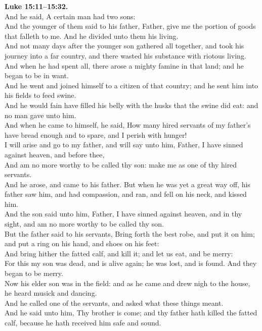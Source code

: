 \documentclass[10pt]{article} %
\begin{document}
{\begin{minipage}[t]{0.45\textwidth}
\textbf{Luke 15:11--15:32.}\\
And he said, A certain man had two sons:\\
And the younger of them said to his father, Father, give me the portion of goods that falleth to me. And he divided unto them his living.\\
And not many days after the younger son gathered all together, and took his journey into a far country, and there wasted his substance with riotous living.\\
And when he had spent all, there arose a mighty famine in that land; and he began to be in want.\\
And he went and joined himself to a citizen of that country; and he sent him into his fields to feed swine.\\
And he would fain have filled his belly with the husks that the swine did eat: and no man gave unto him.\\
And when he came to himself, he said, How many hired servants of my father's have bread enough and to spare, and I perish with hunger!\\
I will arise and go to my father, and will say unto him, Father, I have sinned against heaven, and before thee,\\
And am no more worthy to be called thy son: make me as one of thy hired servants.\\
And he arose, and came to his father. But when he was yet a great way off, his father saw him, and had compassion, and ran, and fell on his neck, and kissed him.\\
And the son said unto him, Father, I have sinned against heaven, and in thy sight, and am no more worthy to be called thy son.\\
But the father said to his servants, Bring forth the best robe, and put it on him; and put a ring on his hand, and shoes on his feet:\\
And bring hither the fatted calf, and kill it; and let us eat, and be merry:\\
For this my son was dead, and is alive again; he was lost, and is found. And they began to be merry.\\
Now his elder son was in the field: and as he came and drew nigh to the house, he heard musick and dancing.\\
And he called one of the servants, and asked what these things meant.\\
And he said unto him, Thy brother is come; and thy father hath killed the fatted calf, because he hath received him safe and sound.\\

\end{minipage}}
\end{document}
